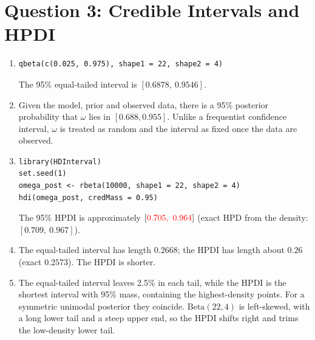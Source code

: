 \documentclass[11pt]{article}
\newcommand{\chk}[1]{{\color{red}#1}}%
\begin{document}
\section*{Question 3: Credible Intervals and HPDI}
\begin{enumerate}
\item \begin{lstlisting}
qbeta(c(0.025, 0.975), shape1 = 22, shape2 = 4)
\end{lstlisting}
The 95\% equal-tailed interval is $[0.6878,\ 0.9546]$.
\item Given the model, prior and observed data, there is a 95\% posterior probability that $\omega$ lies in $[0.688,0.955]$. Unlike a frequentist confidence interval, $\omega$ is treated as random and the interval as fixed once the data are observed.
\item \begin{lstlisting}
library(HDInterval)
set.seed(1)
omega_post <- rbeta(10000, shape1 = 22, shape2 = 4)
hdi(omega_post, credMass = 0.95)
\end{lstlisting}
The 95\% HPDI is approximately $[\chk{0.705,\ 0.964}]$ (exact HPD from the density: $[0.709,\ 0.967]$).
\item The equal-tailed interval has length $0.2668$; the HPDI has length about $0.26$ (exact $0.2573$). The HPDI is shorter.
\item The equal-tailed interval leaves 2.5\% in each tail, while the HPDI is the shortest interval with 95\% mass, containing the highest-density points. For a symmetric unimodal posterior they coincide. $\mathrm{Beta}(22,4)$ is left-skewed, with a long lower tail and a steep upper end, so the HPDI shifts right and trims the low-density lower tail.
\end{enumerate}

\end{document}
